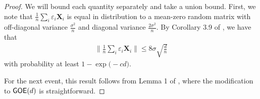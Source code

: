 \documentclass[10pt]{article}
\newcommand{\eps}{\ensuremath{\varepsilon}}
\theoremstyle{definition}
\begin{document}
\begin{proof}
We will bound each quantity separately and take a union bound.  First, we note that 
 $\frac{1}{n}\sum_{i} \eps_i \bm{X}_i$ is equal in distribution to a mean-zero random matrix with off-diagonal variance $\frac{\sigma^2}{n}$ and diagonal variance $\frac{2\sigma^2}{n}$.  By Corollary 3.9 of \citet{bandeira_sharp_2016}, we have that
 \begin{align}
     \bigg\|  \frac{1}{n} \sum_i \eps_i \bm{X}_i \bigg\| \leq 8 \sigma \sqrt{\frac{d}{n}} 
 \end{align}
 with probability at least $1 - \exp\big( - c d \big)$.  

 For the next event, this result follows from Lemma 1 of \citet{candes_tight_2011}, where the modification to ${\sf GOE}(d)$ is straightforward.



\end{proof}
\end{document}
